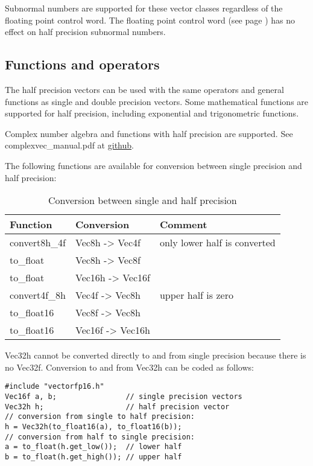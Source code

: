 \documentclass[vcl_manual.tex]{subfiles}
\begin{document}
Subnormal numbers are supported for these vector classes regardless of the floating point control word. The floating point control word (see page \pageref{FPControlWordManipulationFunctions}) has no effect on half precision subnormal numbers.

\subsection{Functions and operators}
The half precision vectors can be used with the same operators and general functions as single and double precision vectors. Some mathematical functions are supported for half precision, including exponential and trigonometric functions.

Complex number algebra and functions with half precision are supported. See  complexvec\_manual.pdf at 
\href{https://github.com/vectorclass/add-on/tree/master/complex}{github}.

The following functions are available for conversion between single precision and half precision:

\begin {table}[H]
\caption{Conversion between single and half precision}
\label{table:HalfVectorClasses}
\begin{tabular}{|p{30mm}|p{35mm}|p{70mm}|}
\hline
\bfseries Function & \bfseries Conversion &  \bfseries Comment \\ \hline
convert8h\_4f & Vec8h -> Vec4f & only lower half is converted \\ \hline
to\_float  & Vec8h -> Vec8f &  \\ \hline
to\_float  & Vec16h -> Vec16f &  \\ \hline
convert4f\_8h & Vec4f -> Vec8h & upper half is zero \\ \hline
to\_float16  & Vec8f -> Vec8h &  \\ \hline
to\_float16  & Vec16f -> Vec16h &  \\ \hline
\end{tabular}
\end{table}

Vec32h cannot be converted directly to and from single precision because there is no Vec32f. Conversion to and from Vec32h can be coded as follows:

\begin{lstlisting}[frame=single]
#include "vectorfp16.h"
Vec16f a, b;                // single precision vectors
Vec32h h;                   // half precision vector
// conversion from single to half precision:
h = Vec32h(to_float16(a), to_float16(b));
// conversion from half to single precision:
a = to_float(h.get_low());  // lower half
b = to_float(h.get_high()); // upper half
\end{lstlisting}
\end{document}
